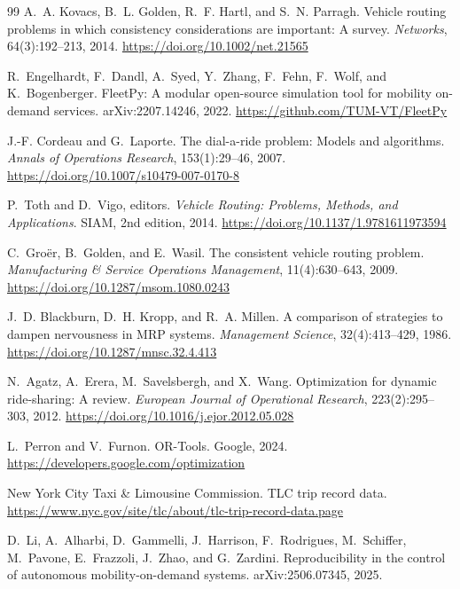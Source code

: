 \begin{thebibliography}{99}
A.~A. Kovacs, B.~L. Golden, R.~F. Hartl, and S.~N. Parragh.
\newblock Vehicle routing problems in which consistency considerations are important: A survey.
\newblock \emph{Networks}, 64(3):192--213, 2014.
\newblock \url{https://doi.org/10.1002/net.21565}

R.~Engelhardt, F.~Dandl, A.~Syed, Y.~Zhang, F.~Fehn, F.~Wolf, and K.~Bogenberger.
\newblock FleetPy: A modular open-source simulation tool for mobility on-demand services.
\newblock arXiv:2207.14246, 2022.
\newblock \url{https://github.com/TUM-VT/FleetPy}

J.-F. Cordeau and G.~Laporte.
\newblock The dial-a-ride problem: Models and algorithms.
\newblock \emph{Annals of Operations Research}, 153(1):29--46, 2007.
\newblock \url{https://doi.org/10.1007/s10479-007-0170-8}

P.~Toth and D.~Vigo, editors.
\newblock \emph{Vehicle Routing: Problems, Methods, and Applications}.
\newblock SIAM, 2nd edition, 2014.
\newblock \url{https://doi.org/10.1137/1.9781611973594}

C.~Groër, B.~Golden, and E.~Wasil.
\newblock The consistent vehicle routing problem.
\newblock \emph{Manufacturing \& Service Operations Management}, 11(4):630--643, 2009.
\newblock \url{https://doi.org/10.1287/msom.1080.0243}

J.~D. Blackburn, D.~H. Kropp, and R.~A. Millen.
\newblock A comparison of strategies to dampen nervousness in MRP systems.
\newblock \emph{Management Science}, 32(4):413--429, 1986.
\newblock \url{https://doi.org/10.1287/mnsc.32.4.413}

N.~Agatz, A.~Erera, M.~Savelsbergh, and X.~Wang.
\newblock Optimization for dynamic ride-sharing: A review.
\newblock \emph{European Journal of Operational Research}, 223(2):295--303, 2012.
\newblock \url{https://doi.org/10.1016/j.ejor.2012.05.028}

L.~Perron and V.~Furnon.
\newblock OR-Tools.
\newblock Google, 2024.
\newblock \url{https://developers.google.com/optimization}

New York City Taxi \& Limousine Commission.
\newblock TLC trip record data.
\newblock \url{https://www.nyc.gov/site/tlc/about/tlc-trip-record-data.page}

D.~Li, A.~Alharbi, D.~Gammelli, J.~Harrison, F.~Rodrigues, M.~Schiffer, M.~Pavone, E.~Frazzoli,
J.~Zhao, and G.~Zardini.
\newblock Reproducibility in the control of autonomous mobility-on-demand systems.
\newblock arXiv:2506.07345, 2025.

\end{thebibliography}
